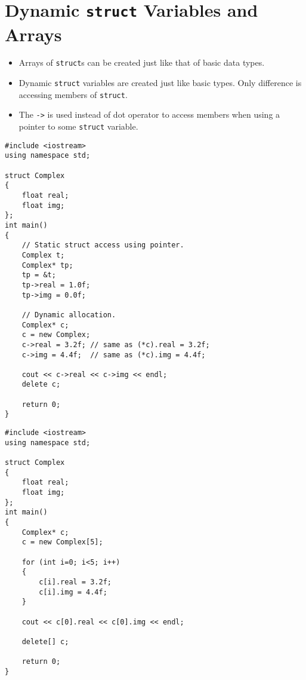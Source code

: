 \documentclass[12pt,a4paper]{article}
\begin{document}
\section{Dynamic \texttt{struct} Variables and Arrays}
\begin{itemize}
\item Arrays of \texttt{struct}s can be created just like that of basic data types.
\item Dynamic \texttt{struct} variables are created just like basic types. Only difference is accessing members of \texttt{struct}.
\item The \verb|->| is used instead of dot operator to access members when using a pointer to some \texttt{struct} variable.
\end{itemize}
\begin{lstlisting}[caption={Dynamic \texttt{struct}}]
#include <iostream>
using namespace std;

struct Complex
{
	float real;
	float img;
};
int main()
{
	// Static struct access using pointer.
	Complex t;
	Complex* tp;
	tp = &t;
	tp->real = 1.0f;
	tp->img = 0.0f;

	// Dynamic allocation.
	Complex* c;
	c = new Complex;
	c->real = 3.2f; // same as (*c).real = 3.2f;
	c->img = 4.4f;  // same as (*c).img = 4.4f;

	cout << c->real << c->img << endl;
	delete c;

	return 0;
}
\end{lstlisting}
\begin{lstlisting}[caption={Array of \texttt{struct}}]
#include <iostream>
using namespace std;

struct Complex
{
	float real;
	float img;
};
int main()
{
	Complex* c;
	c = new Complex[5];

	for (int i=0; i<5; i++)
	{
		c[i].real = 3.2f;
		c[i].img = 4.4f;
	}

	cout << c[0].real << c[0].img << endl;

	delete[] c;

	return 0;
}
\end{lstlisting}
\end{document}
